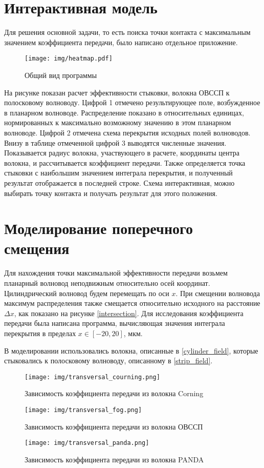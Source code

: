 \section{Интерактивная модель}
Для решения основной задачи, то есть поиска точки контакта с максимальным значением коэффициента передачи, было написано отдельное приложение.

\begin{figure}[h!]
	\texttt{[image: img/heatmap.pdf]}
	\caption{Общий вид программы}
\end{figure}

На рисунке показан расчет эффективности стыковки, волокна ОВССП к полосковому волноводу. Цифрой 1 отмечено результирующее поле, возбужденное в планарном волноводе. Распределение показано в относительных единицах, нормированных к максимально возможному значению в этом планарном волноводе. Цифрой 2 отмечена схема перекрытия исходных полей волноводов. Внизу в таблице отмеченной цифрой 3 выводятся численные значения. Показывается радиус волокна, участвующего в расчете, координаты центра волокна, и рассчитывается коэффициент передачи. Также определяется точка стыковки с наибольшим значением интеграла перекрытия, и полученный результат отображается в последней строке. Схема интерактивная, можно выбирать точку контакта и получать результат для этого положения.

\section{Моделирование поперечного смещения}
\label{transverse_section}

Для нахождения точки максимальной эффективности передачи возьмем планарный волновод неподвижным относительно осей координат. Цилиндрический волновод будем перемещать по оси $x$. При смещении волновода максимум распределения также смещается относительно исходного на расстояние $\Delta x$, как показано на рисунке \ref{intersection}. Для исследования коэффициента передачи была написана программа, вычисляющая значения интеграла перекрытия в пределах $x \in [-20, 20]$, мкм.

В моделировании использовались волокна, описанные в \ref{cylinder_field}, которые стыковались к полосковому волноводу, описанному в \ref{strip_field}.

\begin{figure}[h!]
		\texttt{[image: img/transversal\_courning.png]}
		\caption{Зависимость коэффициента передачи из волокна Corning}
\end{figure}
\begin{figure}[h!]
		\texttt{[image: img/transversal\_fog.png]}
		\caption{Зависимость коэффициента передачи из волокна ОВССП}
		\label{transversal_fog}
\end{figure}
\begin{figure}[h!]
		\texttt{[image: img/transversal\_panda.png]}
		\caption{Зависимость коэффициента передачи из волокна PANDA}
		\label{transversal_panda}
\end{figure}

